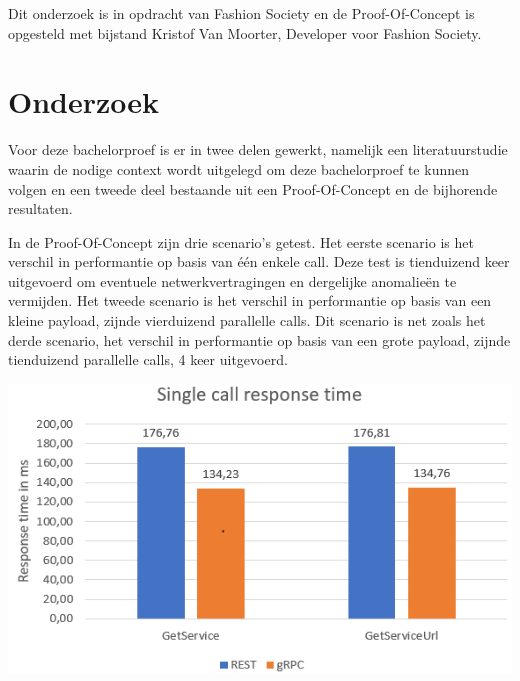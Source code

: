 \documentclass[a0,portrait]{a0poster}
\begin{document}
\begin{multicols}{2}
Dit onderzoek is in opdracht van Fashion Society en de Proof-Of-Concept is opgesteld met bijstand Kristof Van Moorter, Developer voor Fashion Society.

\color{Black} %
\color{HoGentAccent1} 
\section*{Onderzoek}
\color{black}
Voor deze bachelorproef is er in twee delen gewerkt, namelijk een literatuurstudie waarin de nodige context wordt uitgelegd om deze bachelorproef te kunnen volgen en een tweede deel bestaande uit een Proof-Of-Concept en de bijhorende resultaten.

In de Proof-Of-Concept zijn drie scenario's getest. Het eerste scenario is het verschil in performantie op basis van één enkele call. Deze test is tienduizend keer uitgevoerd om eventuele netwerkvertragingen en dergelijke anomalieën te vermijden.
Het tweede scenario is het verschil in performantie op basis van een kleine payload, zijnde vierduizend parallelle calls. Dit scenario is net zoals het derde scenario, het verschil in performantie op basis van een grote payload, zijnde tienduizend parallelle calls, 4 keer uitgevoerd. 

\begin{center}\vspace{1cm}
	\includegraphics[width=1.0\linewidth]{singleCall}
\end{center}\vspace{1cm}



\end{multicols}
\end{document}
